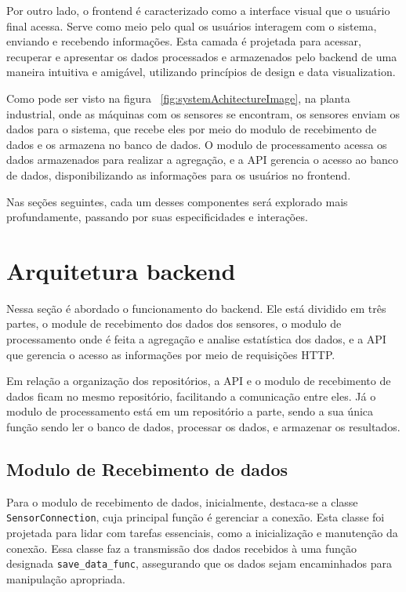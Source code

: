 Por outro lado, o frontend é caracterizado como a interface visual que o usuário final acessa. Serve como meio pelo qual os usuários interagem com o sistema, enviando e recebendo informações. Esta camada é projetada para acessar, recuperar e apresentar os dados processados e armazenados pelo backend de uma maneira intuitiva e amigável, utilizando princípios de design e data visualization.

Como pode ser visto na figura ~\ref{fig:systemAchitectureImage}, na planta industrial, onde as máquinas com os sensores se encontram, os sensores enviam os dados para o sistema, que recebe eles por meio do modulo de recebimento de dados e os armazena no banco de dados. O modulo de processamento acessa os dados armazenados para realizar a agregação, e a API gerencia o acesso ao banco de dados, disponibilizando as informações para os usuários no frontend.

Nas seções seguintes, cada um desses componentes será explorado mais profundamente, passando por suas especificidades e interações.


\section[Arquitetura do backend]{Arquitetura backend}
Nessa seção é abordado o funcionamento do backend. Ele está dividido em três partes, o module de recebimento dos dados dos sensores, o modulo de processamento onde é feita a agregação e analise estatística dos dados, e a API que gerencia o acesso as informações por meio de requisições HTTP.

Em relação a organização dos repositórios, a API e o modulo de recebimento de dados ficam no mesmo repositório, facilitando a comunicação entre eles. Já o modulo de processamento está em um repositório a parte, sendo a sua única função sendo ler o banco de dados, processar os dados, e armazenar os resultados.

\subsection{Modulo de Recebimento de dados}
Para o modulo de recebimento de dados, inicialmente, destaca-se a classe \texttt{SensorConnection}, cuja principal função é gerenciar a conexão. Esta classe foi projetada para lidar com tarefas essenciais, como a inicialização e manutenção da conexão. Essa classe faz a transmissão dos dados recebidos à uma função designada \texttt{save\_data\_func}, assegurando que os dados sejam encaminhados para manipulação apropriada.

